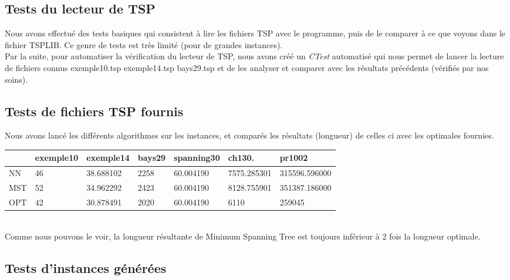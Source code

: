 \documentclass[12pt]{report}
\begin{document}
{{{{{{{\subsection{Tests du lecteur de TSP}

Nous avons effectué des tests basiques qui consistent à lire les fichiers TSP avec le programme, puis de le comparer à ce que voyons dans le fichier TSPLIB. Ce genre de tests est très limité (pour de grandes instances).\\
Par la suite, pour automatiser la vérification du lecteur de TSP, nous avons créé un \textit{CTest} automatisé qui nous permet de lancer la lecture de fichiers connus exemple10.tsp exemple14.tsp bays29.tsp et de les analyser et comparer avec les résultats précédents (vérifiés par nos soins).

\subsection{Tests de fichiers TSP fournis}

Nous avons lancé les différents algorithmes sur les instances, et comparés les résultats (longueur) de celles ci avec les optimales fournies.\

    \begin{tabular}{|l|l|l|l|l|l|l|}
    \hline
    ~   & exemple10 & exemple14 & bays29 & spanning30 & ch130.      & pr1002        \\ \hline
    NN  & 46        & 38.688102 & 2258   & 60.004190  & 7575.285301 & 315596.596000 \\ \hline
    MST & 52        & 34.962292 & 2423   & 60.004190  & 8128.755901 & 351387.186000 \\ \hline
    OPT & 42        & 30.878491 & 2020   & 60.004190  & 6110        & 259045        \\ \hline
    \end{tabular}\\


    Comme nous pouvons le voir, la longueur résultante de Minimum Spanning Tree est toujours inférieur à 2 fois la longueur optimale.
    
\subsection{Tests d'instances générées}

}}}}}}}
\end{document}
